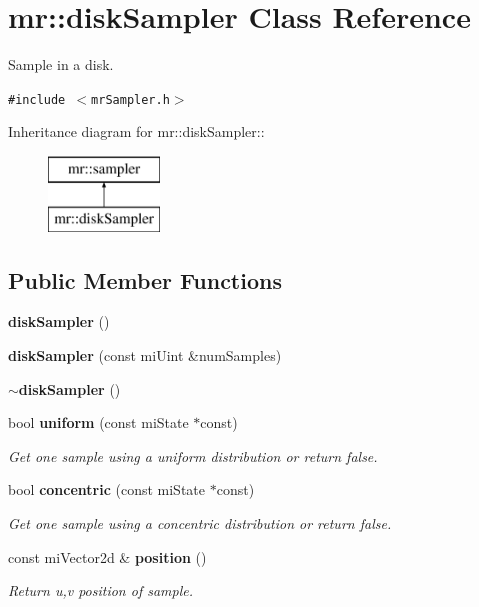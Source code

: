 \section{mr::disk\-Sampler Class Reference}
\label{classmr_1_1diskSampler}
Sample in a disk.  


{\tt \#include $<$mr\-Sampler.h$>$}

Inheritance diagram for mr::disk\-Sampler::\begin{figure}[H]
\begin{center}
\leavevmode
\includegraphics[height=2cm]{classmr_1_1diskSampler}
\end{center}
\end{figure}
\subsection*{Public Member Functions}
\begin{CompactItemize}
\item 
{\bf disk\-Sampler} ()
\item 
{\bf disk\-Sampler} (const mi\-Uint \&num\-Samples)
\item 
{\bf $\sim$disk\-Sampler} ()
\item 
bool {\bf uniform} (const mi\-State $\ast$const)
\begin{CompactList}\small\item\em Get one sample using a uniform distribution or return false. \item\end{CompactList}\item 
bool {\bf concentric} (const mi\-State $\ast$const)
\begin{CompactList}\small\item\em Get one sample using a concentric distribution or return false. \item\end{CompactList}\item 
const mi\-Vector2d \& {\bf position} ()
\begin{CompactList}\small\item\em Return u,v position of sample. \item\end{CompactList}\end{CompactItemize}
